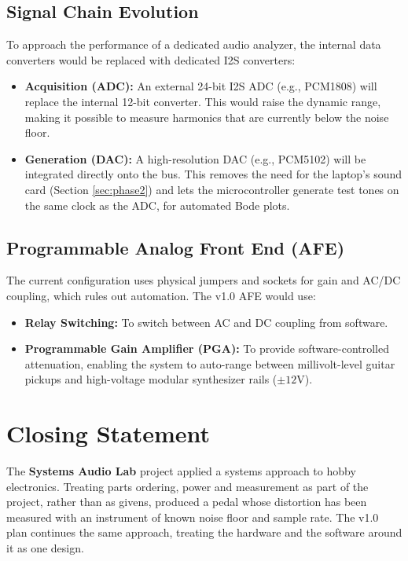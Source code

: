 \documentclass[11pt, a4paper]{report}
\begin{document}
\subsection{Signal Chain Evolution}
To approach the performance of a dedicated audio analyzer, the internal data converters would be replaced with dedicated I2S converters:
\begin{itemize}
  \item \textbf{Acquisition (ADC):} An external 24-bit I2S ADC (e.g., PCM1808) will replace the internal 12-bit converter. This would raise the dynamic range, making it possible to measure harmonics that are currently below the noise floor.
  \item \textbf{Generation (DAC):} A high-resolution DAC (e.g., PCM5102) will be integrated directly onto the bus. This removes the need for the laptop's sound card (Section \ref{sec:phase2}) and lets the microcontroller generate test tones on the same clock as the ADC, for automated Bode plots.
\end{itemize}

\subsection{Programmable Analog Front End (AFE)}
The current configuration uses physical jumpers and sockets for gain and AC/DC coupling, which rules out automation. The v1.0 AFE would use:
\begin{itemize}
  \item \textbf{Relay Switching:} To switch between AC and DC coupling from software.
  \item \textbf{Programmable Gain Amplifier (PGA):} To provide software-controlled attenuation, enabling the system to auto-range between millivolt-level guitar pickups and high-voltage modular synthesizer rails ($\pm 12\text{V}$).
\end{itemize}

\section{Closing Statement}
The \textbf{Systems Audio Lab} project applied a systems approach to hobby electronics. Treating parts ordering, power and measurement as part of the project, rather than as givens, produced a pedal whose distortion has been measured with an instrument of known noise floor and sample rate. The v1.0 plan continues the same approach, treating the hardware and the software around it as one design.
\end{document}
